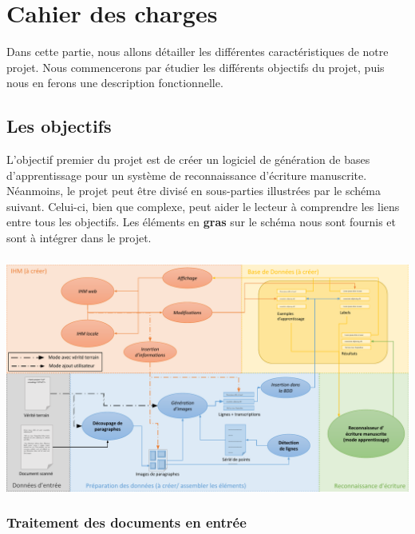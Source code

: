 \chapter{Cahier des charges}

Dans cette partie, nous allons détailler les différentes caractéristiques de notre projet.
Nous commencerons par étudier les différents objectifs du projet, puis nous en ferons
une description fonctionnelle.

\section{Les objectifs}

L’objectif premier du projet est de créer un logiciel de génération de bases d’apprentissage
pour un système de reconnaissance d’écriture manuscrite. Néanmoins, le projet peut être divisé
en sous-parties illustrées par le schéma suivant. Celui-ci, bien que complexe, peut aider le
lecteur à comprendre les liens entre tous les objectifs. Les éléments en \textbf{gras} sur le
schéma nous sont fournis et sont à intégrer dans le projet.

\paragraph{}
\begin{mdframed}[frametitle={Schéma résumant les différents aspects du projet}, innerbottommargin=10]
\begin{center}
\includegraphics[width=\linewidth]{schema.pdf}
\end{center}
\end{mdframed}

\subsection{Traitement des documents en entrée}

